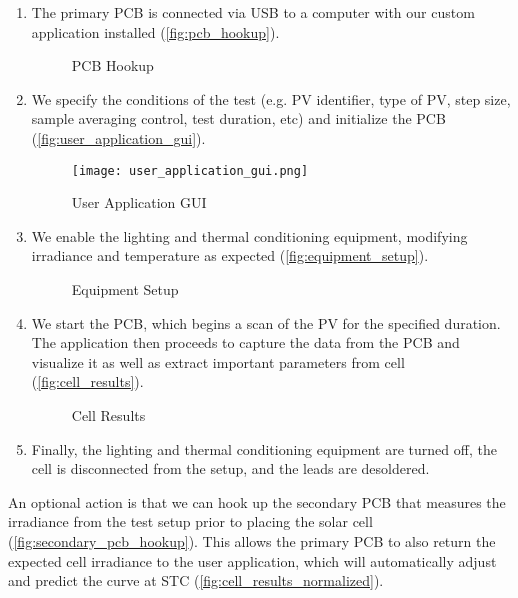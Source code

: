 \begin{enumerate}
    \item The primary \ac{PCB} is connected via \ac{USB} to a computer with our
    custom application installed (\autoref{fig:pcb_hookup}).

    \begin{figure}[!htbp]
        \caption{\ac{PCB} Hookup}
        \label{fig:pcb_hookup}
    \end{figure}

    \item We specify the conditions of the test (e.g. \ac{PV} identifier, type
    of \ac{PV}, step size, sample averaging control, test duration, etc) and
    initialize the \ac{PCB} (\autoref{fig:user_application_gui}).

    \begin{figure}[!htbp]
        \texttt{[image: user\_application\_gui.png]}
        \caption{User Application \ac{GUI}}
        \label{fig:user_application_gui}
    \end{figure}

    \item We enable the lighting and thermal conditioning equipment, modifying
    irradiance and temperature as expected (\autoref{fig:equipment_setup}).

    \begin{figure}[!htbp]
        \caption{Equipment Setup}
        \label{fig:equipment_setup}
    \end{figure}

    \item We start the \ac{PCB}, which begins a scan of the \ac{PV} for the
    specified duration. The application then proceeds to capture the data from
    the \ac{PCB} and visualize it as well as extract important parameters from
    cell (\autoref{fig:cell_results}).

    \begin{figure}[!htbp]
        \caption{Cell Results}
        \label{fig:cell_results}
    \end{figure}

    \item Finally, the lighting and thermal conditioning equipment are turned
    off, the cell is disconnected from the setup, and the leads are desoldered.
\end{enumerate}

An optional action is that we can hook up the secondary \ac{PCB} that measures
the irradiance from the test setup prior to placing the solar cell
(\autoref{fig:secondary_pcb_hookup}). This allows the primary \ac{PCB} to also
return the expected cell irradiance to the user application, which will
automatically adjust and predict the curve at \ac{STC}
(\autoref{fig:cell_results_normalized}).

